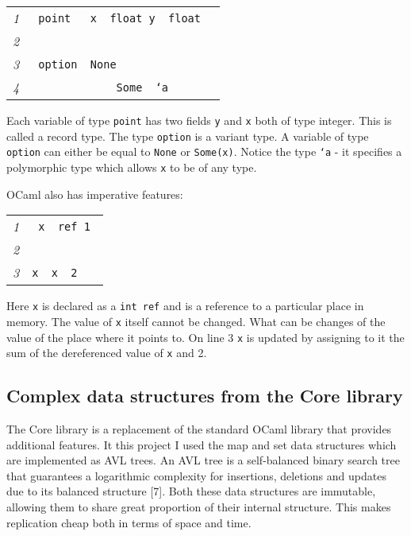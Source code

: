\documentclass[12pt,twoside,notitlepage]{report}
\newcommand{\mlkeywordA}[1]{\mbox{\color{cyan}{\textbf{\texttt{#1}}}}}
\newcommand{\mlkeyword}[1]{\mbox{\color{red}{#1}}}
\newcommand{\mloperator}[1]{\mbox{\color{darkgreen}{#1}}}
\newcommand{\mlcodeline}[2]{\tiny\sl #1 & \begin{minipage}[c]{0.8\linewidth}\begin{alltt}\mbox{#2}\end{alltt}\end{minipage}\\}
\begin{document}
{\scriptsize\noindent\begin{longtable}{r|l}
\mlcodeline{1}{\mlkeyword{type}~point~\mlkeyword{=}~\mloperator{\{}~x~\mloperator{\mbox{\COLON}}~float\mloperator{\mbox{\SC}}~y~\mloperator{\mbox{\COLON}}~float~\mloperator{\}}
}
\mlcodeline{2}{
}
\mlcodeline{3}{\mlkeyword{type}~option~\mlkeyword{=}~None
}
\mlcodeline{4}{~~~~~~~~~~~~~\mloperator{|}Some~\mlkeyword{of}~`a
}
\end{longtable}
}
Each variable of type {\tt point} has two fields {\tt y} and {\tt x} both of type integer. This is called a record type. The type {\tt option} is a variant type. A variable of type {\tt option} can either be equal to {\tt None} or {\tt Some(x)}. Notice the type {\tt `a} - it specifies a polymorphic type which allows {\tt x} to be of any type.

OCaml also has imperative features:



{\scriptsize\noindent\begin{longtable}{r|l}
\mlcodeline{1}{\mlkeywordA{let}~x~\mlkeyword{=}~ref~1
}
\mlcodeline{2}{
}
\mlcodeline{3}{x~\mloperator{\mbox{\COLON}{}=}~\mloperator{\mbox{}\hspace{0pt}{!}\hspace{0pt}}x~\mloperator{+}~2~
}
\end{longtable}
}

Here {\tt x} is declared as a {\tt int ref} and is a reference to a particular place in memory. The value of {\tt x} itself cannot be changed. What can be changes of the value of the place where it points to. On line 3 {\tt x} is updated by assigning to it the sum of the dereferenced value of {\tt x} and 2.  


\subsection{Complex data structures from the Core library}
\label{datastruct_core}
The Core library is a replacement of the standard OCaml library that provides additional features. It this project I used the map and set data structures which are implemented as AVL trees. An AVL tree is a self-balanced binary search tree that guarantees a logarithmic complexity for insertions, deletions and updates due to its balanced structure [7]. Both these data structures are immutable, allowing them to share great proportion of their internal structure. This makes replication cheap both in terms of space and time. 
\end{document}
